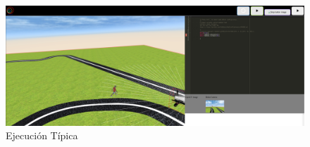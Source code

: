 \begin{figure}[H]
  \begin{center}
    \includegraphics[width=1\textwidth]{figures/simulado/ejemplo1.png}
		\caption{Ejecución Típica}
		\label{fig:ejecucion_sim}
		\end{center}
\end{figure}


